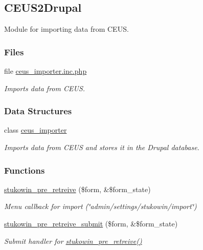 \hypertarget{group___c_e_u_s2_drupal}{\subsection{C\+E\+U\+S2\+Drupal}
\label{group___c_e_u_s2_drupal}
}


Module for importing data from C\+E\+U\+S.  


\subsubsection*{Files}
\begin{DoxyCompactItemize}
\item 
file \hyperlink{ceus__importer_8inc_8php}{ceus\+\_\+importer.\+inc.\+php}
\begin{DoxyCompactList}\small\item\em Imports data from C\+E\+U\+S. \end{DoxyCompactList}\end{DoxyCompactItemize}
\subsubsection*{Data Structures}
\begin{DoxyCompactItemize}
\item 
class \hyperlink{classceus__importer}{ceus\+\_\+importer}
\begin{DoxyCompactList}\small\item\em Imports data from C\+E\+U\+S and stores it in the Drupal database. \end{DoxyCompactList}\end{DoxyCompactItemize}
\subsubsection*{Functions}
\begin{DoxyCompactItemize}
\item 
\hyperlink{group___c_e_u_s2_drupal_ga481789ce9904fc10aefb8eaf7534133b}{stukowin\+\_\+pre\+\_\+retreive} (\$form, \&\$form\+\_\+state)
\begin{DoxyCompactList}\small\item\em Menu callback for import (\char`\"{}admin/settings/stukowin/import\char`\"{}) \end{DoxyCompactList}\item 
\hyperlink{group___c_e_u_s2_drupal_ga433b18d1cf617b28cca3fc0dd47d8062}{stukowin\+\_\+pre\+\_\+retreive\+\_\+submit} (\$form, \&\$form\+\_\+state)
\begin{DoxyCompactList}\small\item\em Submit handler for \hyperlink{group___c_e_u_s2_drupal_ga481789ce9904fc10aefb8eaf7534133b}{stukowin\+\_\+pre\+\_\+retreive()} \end{DoxyCompactList}\end{DoxyCompactItemize}


